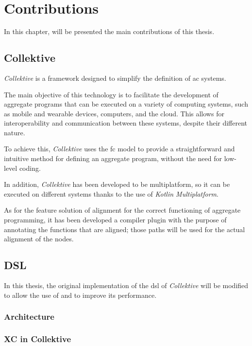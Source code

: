 
\chapter{Contributions}
\label{ch:contributions}
In this chapter, will be presented the main contributions of this thesis.

\section{Collektive}
\label{sec:collektive}

\emph{Collektive} is a framework designed to simplify the definition of \ac{ac} systems.

The main objective of this technology is to facilitate the development of aggregate programs that can be executed on a
variety of computing systems, such as mobile and wearable devices, computers, and the cloud.
This allows for interoperability and communication between these systems, despite their different nature.

To achieve this, \emph{Collektive} uses the \ac{fc} model to provide a straightforward and intuitive method for defining
an aggregate program, without the need for low-level coding.

In addition, \emph{Collektive} has been developed to be multiplatform, so it can be executed on different systems thanks
to the use of \emph{Kotlin Multiplatform}.

As for the feature solution of alignment for the correct functioning of aggregate programming,
it has been developed a compiler plugin with the purpose of annotating the functions that are aligned;
those paths will be used for the actual alignment of the nodes.

\section{DSL}
\label{sec:dsl}

In this thesis, the original implementation of the \ac{dsl} of \emph{Collektive} will be modified to allow the use of \xc{}
and to improve its performance.

\subsection{Architecture}
\label{subsec:architecture}

\subsection{XC in Collektive}
\label{subsec:exchange-in-collektive}


